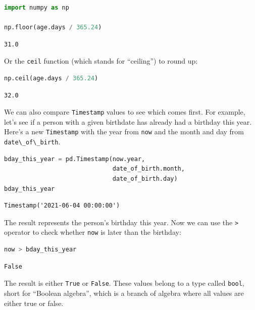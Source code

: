 \begin{lstlisting}[language=Python,style=source]
import numpy as np

np.floor(age.days / 365.24)
\end{lstlisting}

\begin{lstlisting}[style=output]
31.0
\end{lstlisting}

Or the \passthrough{\lstinline!ceil!} function (which stands for
``ceiling'') to round up:

\begin{lstlisting}[language=Python,style=source]
np.ceil(age.days / 365.24)
\end{lstlisting}

\begin{lstlisting}[style=output]
32.0
\end{lstlisting}

We can also compare \passthrough{\lstinline!Timestamp!} values to see
which comes first. For example, let's see if a person with a given
birthdate has already had a birthday this year. Here's a new
\passthrough{\lstinline!Timestamp!} with the year from
\passthrough{\lstinline!now!} and the month and day from
\passthrough{\lstinline!date\_of\_birth!}.

\begin{lstlisting}[language=Python,style=source]
bday_this_year = pd.Timestamp(now.year, 
                              date_of_birth.month, 
                              date_of_birth.day)
bday_this_year
\end{lstlisting}

\begin{lstlisting}[style=output]
Timestamp('2021-06-04 00:00:00')
\end{lstlisting}

The result represents the person's birthday this year. Now we can use
the \passthrough{\lstinline!>!} operator to check whether
\passthrough{\lstinline!now!} is later than the birthday:

\begin{lstlisting}[language=Python,style=source]
now > bday_this_year
\end{lstlisting}

\begin{lstlisting}[style=output]
False
\end{lstlisting}

The result is either \passthrough{\lstinline!True!} or
\passthrough{\lstinline!False!}. These values belong to a type called
\passthrough{\lstinline!bool!}, short for ``Boolean algebra'', which is
a branch of algebra where all values are either true or false.

